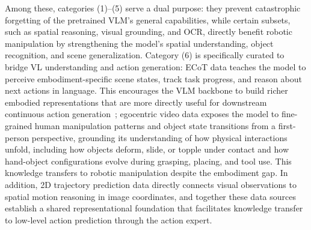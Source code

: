 Among these, categories (1)–(5) serve a dual purpose: they prevent catastrophic forgetting of the pretrained VLM's general capabilities, while certain subsets, such as spatial reasoning, visual grounding, and OCR, directly benefit robotic manipulation by strengthening the model's spatial understanding, object recognition, and scene generalization. Category (6) is specifically curated to bridge VL understanding and action generation: ECoT data teaches the model to perceive embodiment-specific scene states, track task progress, and reason about next actions in language. This encourages the VLM backbone to build richer embodied representations that are more directly useful for downstream continuous action generation~\citep{zawalski2024robotic, Chen2025TrainingSF}; egocentric video data exposes the model to fine-grained human manipulation patterns and object state transitions from a first-person perspective, grounding its understanding of how physical interactions unfold, including how objects deform, slide, or topple under contact and how hand-object configurations evolve during grasping, placing, and tool use. This knowledge transfers to robotic manipulation despite the embodiment gap. In addition, 2D trajectory prediction data directly connects visual observations to spatial motion reasoning in image coordinates, and together these data sources establish a shared representational foundation that facilitates knowledge transfer to low-level action prediction through the action expert.







